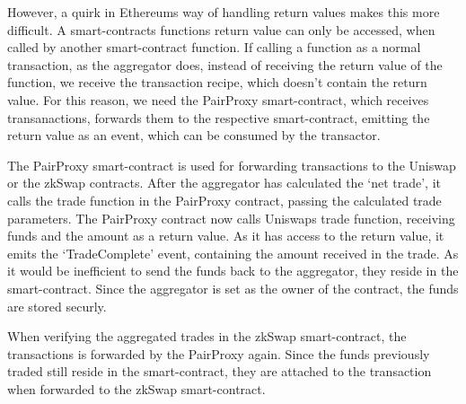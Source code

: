 \documentclass[../../thesis.tex]{subfiles}
\begin{document}
However, a quirk in Ethereums way of handling return values makes this more difficult. A smart-contracts functions return value can only be accessed, when called by another smart-contract function. If calling a function as a normal transaction, as the aggregator does, instead of receiving the return value of the function, we receive the transaction recipe, which doesn't contain the return value. For this reason, we need the PairProxy smart-contract, which receives transanactions, forwards them to the respective smart-contract, emitting the return value as an event, which can be consumed by the transactor. 

The PairProxy smart-contract is used for forwarding transactions to the Uniswap or the zkSwap contracts. After the aggregator has calculated the `net trade', it calls the trade function in the PairProxy contract, passing the calculated trade parameters. The PairProxy contract now calls Uniswaps trade function, receiving funds and the amount as a return value. As it has access to the return value, it emits the `TradeComplete' event, containing the amount received in the trade. As it would be inefficient to send the funds back to the aggregator, they reside in the smart-contract. Since the aggregator is set as the owner of the contract, the funds are stored securly.

When verifying the aggregated trades in the zkSwap smart-contract, the transactions is forwarded by the PairProxy again. Since the funds previously traded still reside in the smart-contract, they are attached to the transaction when forwarded to the zkSwap smart-contract.








\end{document}
